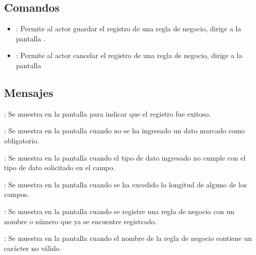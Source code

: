 \subsection{Comandos}
\begin{itemize}
	\item {}: Permite al actor guardar el registro de una regla de negocio, dirige a la pantalla .
	\item {}: Permite al actor cancelar el registro de una regla de negocio, dirige a la pantalla 
\end{itemize}

\subsection{Mensajes}

\begin{Citemize}
	\item {}: Se muestra en la pantalla  para indicar que el registro fue exitoso.
	\item {}: Se muestra en la pantalla  cuando no se ha ingresado un dato marcado como obligatorio.
	\item {}: Se muestra en la pantalla  cuando el tipo de dato ingresado no cumple con el tipo de dato solicitado en el campo.
	\item {}: Se muestra en la pantalla  cuando se ha excedido la longitud de alguno de los campos.
	\item {}: Se muestra en la pantalla  cuando se registre una regla de negocio con un nombre o número que ya se encuentre registrado.
	\item {}: Se muestra en la pantalla  cuando el nombre de la regla de negocio contiene un carácter no válido.
\end{Citemize}

